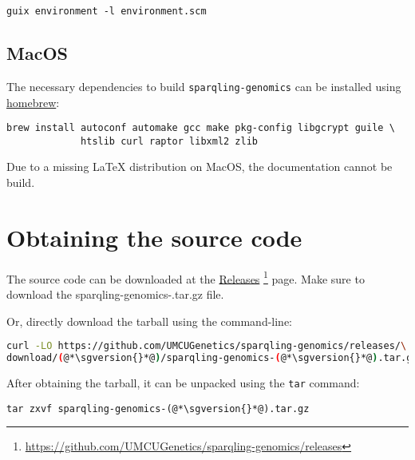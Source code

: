 \begin{siderules}
\begin{verbatim}
guix environment -l environment.scm
\end{verbatim}
\end{siderules}

\subsection{MacOS}

  The necessary dependencies to build \texttt{sparqling-genomics} can be
  installed using \href{https://brew.sh/}{homebrew}:

\begin{siderules}
\begin{verbatim}
brew install autoconf automake gcc make pkg-config libgcrypt guile \
             htslib curl raptor libxml2 zlib
\end{verbatim}
\end{siderules}

  Due to a missing \LaTeX{} distribution on MacOS, the documentation
  cannot be build.

\section{Obtaining the source code}
\label{sec:obtaining-tarball}

  \begin{sloppypar}
  The source code can be downloaded at the
  \href{https://github.com/UMCUGenetics/sparqling-genomics/releases}%
  {Releases}%
  \footnote{\url{https://github.com/UMCUGenetics/sparqling-genomics/releases}}
  page.  Make sure to download the {\fontfamily{\ttdefault}\selectfont
    sparqling-genomics-\sgversion{}.tar.gz} file.
  \end{sloppypar}

  Or, directly download the tarball using the command-line:
\begin{siderules}
\begin{lstlisting}[language=bash]
curl -LO https://github.com/UMCUGenetics/sparqling-genomics/releases/\
download/(@*\sgversion{}*@)/sparqling-genomics-(@*\sgversion{}*@).tar.gz
\end{lstlisting}
\end{siderules}

  After obtaining the tarball, it can be unpacked using the \texttt{tar}
  command:

\begin{siderules}
\begin{lstlisting}
tar zxvf sparqling-genomics-(@*\sgversion{}*@).tar.gz
\end{lstlisting}
\end{siderules}

